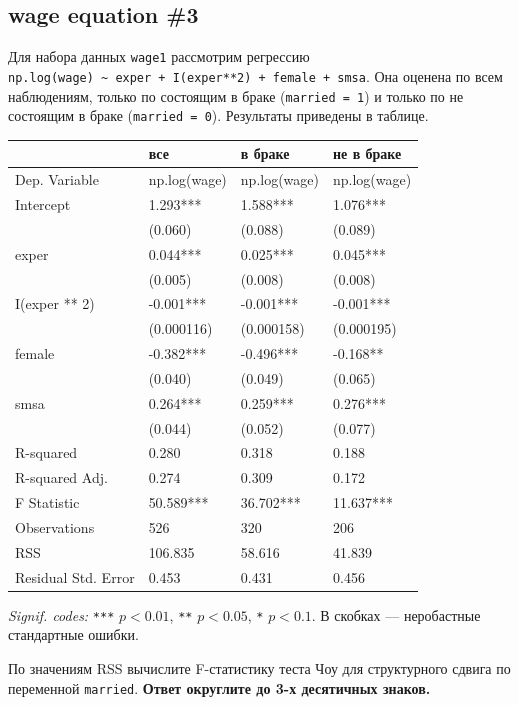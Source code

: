 \documentclass[
  russian,
]{article}
\newcounter{none} %
\begin{document}
\subsection{wage equation \#3}\label{wage-equation-3}

Для набора данных \texttt{wage1} рассмотрим регрессию
\texttt{np.log(wage)\ \textasciitilde{}\ exper\ +\ I(exper**2)\ +\ female\ +\ smsa}.
Она оценена по всем наблюдениям, только по состоящим в браке
(\texttt{married\ =\ 1}) и только по не состоящим в браке
(\texttt{married\ =\ 0}). Результаты приведены в таблице.

{\def\LTcaptype{none} %
\begin{longtable}[]{@{}llll@{}}
\toprule\noalign{}
& все & в браке & не в браке \\
\midrule\noalign{}
\endhead
\bottomrule\noalign{}
\endlastfoot
Dep. Variable & np.log(wage) & np.log(wage) & np.log(wage) \\
Intercept & 1.293*** & 1.588*** & 1.076*** \\
& (0.060) & (0.088) & (0.089) \\
exper & 0.044*** & 0.025*** & 0.045*** \\
& (0.005) & (0.008) & (0.008) \\
I(exper ** 2) & -0.001*** & -0.001*** & -0.001*** \\
& (0.000116) & (0.000158) & (0.000195) \\
female & -0.382*** & -0.496*** & -0.168** \\
& (0.040) & (0.049) & (0.065) \\
smsa & 0.264*** & 0.259*** & 0.276*** \\
& (0.044) & (0.052) & (0.077) \\
R-squared & 0.280 & 0.318 & 0.188 \\
R-squared Adj. & 0.274 & 0.309 & 0.172 \\
F Statistic & 50.589*** & 36.702*** & 11.637*** \\
Observations & 526 & 320 & 206 \\
RSS & 106.835 & 58.616 & 41.839 \\
Residual Std. Error & 0.453 & 0.431 & 0.456 \\
\end{longtable}
}

\emph{Signif. codes:} \texttt{***} \(p<0.01\), \texttt{**} \(p<0.05\),
\texttt{*} \(p<0.1\). В скобках --- неробастные стандартные ошибки.

По значениям RSS вычислите F-статистику теста Чоу для структурного
сдвига по переменной \texttt{married}. \textbf{Ответ округлите до 3-х
десятичных знаков.}
\end{document}
